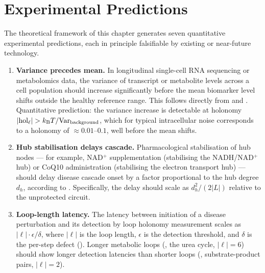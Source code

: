 \section{Experimental Predictions}
\label{sec:fuzzy-predictions}

The theoretical framework of this chapter generates seven quantitative
experimental predictions, each in principle falsifiable by existing or
near-future technology.

\begin{enumerate}[label=\textbf{P\arabic*.}, itemsep=6pt, leftmargin=*]

  \item \textbf{Variance precedes mean.}
        In longitudinal single-cell RNA sequencing or metabolomics data,
        the variance of transcript or metabolite levels across a cell
        population should increase significantly before the mean biomarker
        level shifts outside the healthy reference range.  This follows
        directly from  and
        .  Quantitative prediction: the
        variance increase is detectable at holonomy
        $|\mathrm{hol}_\ell| > k_{\mathrm{B}} T / \mathrm{Var}_{\mathrm{background}}$,
        which for typical intracellular noise corresponds to a holonomy
        of $\approx 0.01$--$0.1$, well before the mean shifts.

  \item \textbf{Hub stabilisation delays cascade.}
        Pharmacological stabilisation of hub nodes --- for example,
        NAD$^+$ supplementation (stabilising the NADH/NAD$^+$ hub) or
        CoQ10 administration (stabilising the electron transport hub) ---
        should delay disease cascade onset by a factor proportional to
        the hub degree $d_h$, according to .
        Specifically, the delay should scale as $d_h^2 / (2|L|)$ relative
        to the unprotected circuit.

  \item \textbf{Loop-length latency.}
        The latency between initiation of a disease perturbation and its
        detection by loop holonomy measurement scales as $|\ell| \cdot \epsilon/\delta$,
        where $|\ell|$ is the loop length, $\epsilon$ is the detection
        threshold, and $\delta$ is the per-step defect ().
        Longer metabolic loops (\eg, the urea cycle, $|\ell| = 6$) should
        show longer detection latencies than shorter loops (\eg,
        substrate-product pairs, $|\ell| = 2$).


\end{enumerate}
